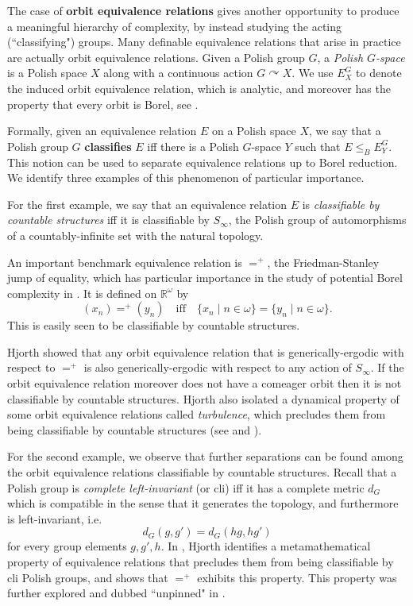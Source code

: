 \documentclass[12pt]{amsart}
\theoremstyle{plain}
\theoremstyle{definition}
\begin{document}
The case of \textbf{orbit equivalence relations} gives another opportunity to produce a meaningful hierarchy of complexity, by instead studying the acting (``classifying") groups.
Many definable equivalence relations that arise in practice are actually orbit equivalence relations.
Given a Polish group $G$, a \emph{Polish $G$-space} is a Polish space $X$ along with a continuous action $G \curvearrowright X$.
We use $E^G_X$ to denote the induced orbit equivalence relation, which is analytic, and moreover has the property that every orbit is Borel, see \cite[2.3.4]{BeckerKechris1996}.

Formally, given an equivalence relation $E$ on a Polish space $X$, we say that a Polish group $G$ \textbf{classifies} $E$ iff there is a Polish $G$-space $Y$ such that $E \le_B E^G_Y$.
This notion can be used to separate equivalence relations up to Borel reduction.
We identify three examples of this phenomenon of particular importance.

For the first example, we say that an equivalence relation $E$ is \emph{classifiable by countable structures} iff it is classifiable by $S_\infty$, the Polish group of automorphisms of a countably-infinite set with the natural topology.

An important benchmark equivalence relation is $=^+$, the Friedman-Stanley jump of equality, which has particular importance in the study of potential Borel complexity in \cite{HKL1998}.
It is defined on $\mathbb{R}^\omega$ by 
\[(x_n) \mathrel{=^+} (y_n) \quad \text{iff} \quad \{x_n \mid n \in \omega\} = \{y_n \mid n \in \omega\}.\]
This is easily seen to be classifiable by countable structures.

Hjorth showed that any orbit equivalence relation that is generically-ergodic with respect to $=^+$ is also generically-ergodic with respect to any action of $S_\infty$.
If the orbit equivalence relation moreover does not have a comeager orbit then it is not classifiable by countable structures.
Hjorth also isolated a dynamical property of some orbit equivalence relations called \emph{turbulence}, which precludes them from being classifiable by countable structures (see \cite{HjorthBook} and \cite{Hjorth2002Turbulence}).

For the second example, we observe that further separations can be found among the orbit equivalence relations classifiable by countable structures.
Recall that a Polish group is \emph{complete left-invariant} (or cli) iff it has a complete metric $d_G$ which is compatible in the sense that it generates the topology, and furthermore is left-invariant, i.e.
\[d_G(g, g') = d_G(hg, hg')\]
for every group elements $g, g', h$.
In \cite{Hjorth1999}, Hjorth identifies a metamathematical property of equivalence relations that precludes them from being classifiable by cli Polish groups, and shows that $=^+$ exhibits this property.
This property was further explored and dubbed ``unpinned" in \cite{Kanovei2008}.
\end{document}
